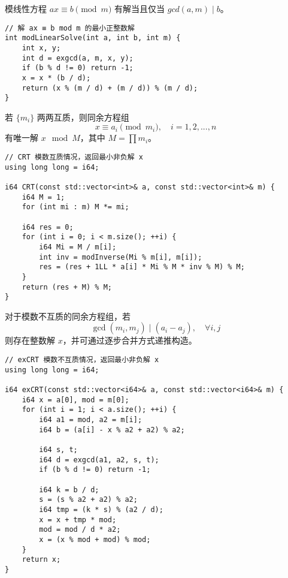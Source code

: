 \begin{theorem}[解模线性方程]
模线性方程 $ax \equiv b \pmod{m}$ 有解当且仅当 $gcd(a, m) \mid b$。
\end{theorem}

\begin{lstlisting}
// 解 ax ≡ b mod m 的最小正整数解
int modLinearSolve(int a, int b, int m) {
    int x, y;
    int d = exgcd(a, m, x, y);
    if (b % d != 0) return -1;
    x = x * (b / d);
    return (x % (m / d) + (m / d)) % (m / d);
}
\end{lstlisting}

\begin{theorem}[中国剩余定理]
若 $\{m_i\}$ 两两互质，则同余方程组
\[
x \equiv a_i \pmod{m_i}, \quad i =  1,2,...,n
\]
有唯一解 $x \mod M$，其中 $M = \prod m_i$。
\end{theorem}
\begin{lstlisting}
// CRT 模数互质情况，返回最小非负解 x
using long long = i64;

i64 CRT(const std::vector<int>& a, const std::vector<int>& m) {
    i64 M = 1;
    for (int mi : m) M *= mi;

    i64 res = 0;
    for (int i = 0; i < m.size(); ++i) {
        i64 Mi = M / m[i];
        int inv = modInverse(Mi % m[i], m[i]);
        res = (res + 1LL * a[i] * Mi % M * inv % M) % M;
    }
    return (res + M) % M;
}
\end{lstlisting}

\begin{theorem}[扩展中国剩余定理]
对于模数不互质的同余方程组，若
\[
\gcd(m_i, m_j) \mid (a_i - a_j), \quad \forall i, j
\]
则存在整数解 $x$，并可通过逐步合并方式递推构造。
\end{theorem}

\begin{lstlisting}
// exCRT 模数不互质情况，返回最小非负解 x
using long long = i64;

i64 exCRT(const std::vector<i64>& a, const std::vector<i64>& m) {
    i64 x = a[0], mod = m[0];
    for (int i = 1; i < a.size(); ++i) {
        i64 a1 = mod, a2 = m[i];
        i64 b = (a[i] - x % a2 + a2) % a2;

        i64 s, t;
        i64 d = exgcd(a1, a2, s, t);
        if (b % d != 0) return -1;

        i64 k = b / d;
        s = (s % a2 + a2) % a2;
        i64 tmp = (k * s) % (a2 / d);
        x = x + tmp * mod;
        mod = mod / d * a2;
        x = (x % mod + mod) % mod;
    }
    return x;
}
\end{lstlisting}


